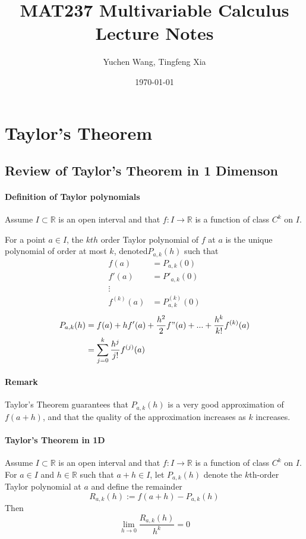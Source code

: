 \documentclass[11pt]{article}
\title{MAT237 Multivariable Calculus \\ Lecture Notes}
\author{Yuchen Wang, Tingfeng Xia}
\date{\today}
\newcommand{\real}[0]{\mathbb{R}}
\begin{document}
    \maketitle
    \tableofcontents
    \newpage
\section{Taylor's Theorem}
\subsection{Review of Taylor's Theorem in 1 Dimenson}
\paragraph{Definition of Taylor polynomials} Assume $I \subset \real$ is an open interval and that $f: I \rightarrow \real$ is a function of class $C^k$ on $I$.

For a point $a\in I$, the $kth$ order Taylor polynomial of $f$ at $a$ is the unique polynomial of order at most $k$, denoted$P_{a,k}(h)$ such that
\begin{align*}
    f(a) &= P_{a,k}(0)\\
    f'(a) &= P'_{a,k}(0)\\
    \vdots\\
    f^{(k)}(a) &= P_{a,k}^{(k)}(0)
\end{align*}
\begin{align*}
    P_{a,k}(h) &= f(a) + hf'(a) + \frac{h^2}{2}f"(a) +...+\frac{h^k}{k!}f^{(k)}(a)\\
    &= \sum_{j=0}^{k}\frac{h^j}{j!}f^{(j)}(a)
\end{align*}
\paragraph{Remark}
Taylor's Theorem guarantees that $P_{a,k}(h)$ is a very good approximation of $f(a+h)$, and that the quality of the approximation increases as $k$ increases.
\paragraph{Taylor's Theorem in 1D}Assume $I \subset \real$ is an open interval and that $f: I \rightarrow \real$ is a function of class $C^k$ on $I$. For $a \in I$ and $h \in \real$ such that $a+h\in I$, let $P_{a,k}(h)$ denote the $k$th-order Taylor polynomial at $a$ and define the remainder
$$R_{a,k}(h) := f(a+h) - P_{a,k}(h)$$
Then $$\lim_{h\rightarrow0}\frac{R_{a,k}(h)}{h^k} = 0$$
\end{document}
